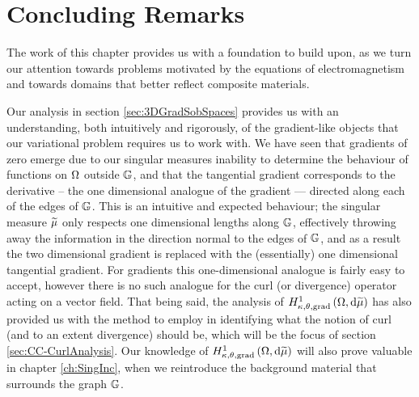 \section{Concluding Remarks} \label{sec:Scalar-Conc}
The work of this chapter provides us with a foundation to build upon, as we turn our attention towards problems motivated by the equations of electromagnetism and towards domains that better reflect composite materials.

Our analysis in section \ref{sec:3DGradSobSpaces} provides us with an understanding, both intuitively and rigorously, of the gradient-like objects that our variational problem requires us to work with.
We have seen that gradients of zero emerge due to our singular measures inability to determine the behaviour of functions on $\Omega$ outside $\mathbb{G}$, and that the tangential gradient corresponds to the derivative -- the one dimensional analogue of the gradient --- directed along each of the edges of $\mathbb{G}$.
This is an intuitive and expected behaviour; the singular measure $\widetilde{\mu}$ only respects one dimensional lengths along $\mathbb{G}$, effectively throwing away the information in the direction normal to the edges of $\mathbb{G}$, and as a result the two dimensional gradient is replaced with the (essentially) one dimensional tangential gradient.
For gradients this one-dimensional analogue is fairly easy to accept, however there is no such analogue for the curl (or divergence) operator acting on a vector field.
That being said, the analysis of $H^1_{\kappa,\theta,\mathrm{grad}}\left( \Omega, \mathrm{d}\widetilde{\mu} \right)$ has also provided us with the method to employ in identifying what the notion of curl (and to an extent divergence) should be, which will be the focus of section \ref{sec:CC-CurlAnalysis}.
Our knowledge of $H^1_{\kappa,\theta,\mathrm{grad}}\left( \Omega, \mathrm{d}\widetilde{\mu} \right)$ will also prove valuable in chapter \ref{ch:SingInc}, when we reintroduce the background material that surrounds the graph $\mathbb{G}$.

